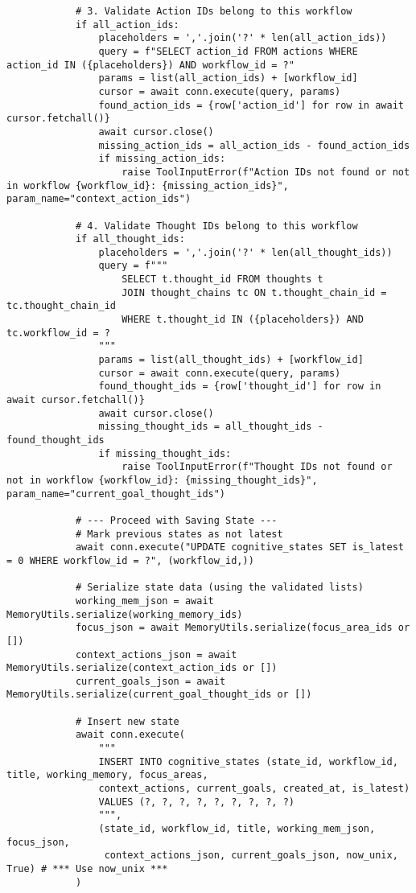 \documentclass[12pt,a4paper]{article}
\begin{document}
\begin{pageablecode}
\begin{verbatim}
            # 3. Validate Action IDs belong to this workflow
            if all_action_ids:
                placeholders = ','.join('?' * len(all_action_ids))
                query = f"SELECT action_id FROM actions WHERE action_id IN ({placeholders}) AND workflow_id = ?"
                params = list(all_action_ids) + [workflow_id]
                cursor = await conn.execute(query, params)
                found_action_ids = {row['action_id'] for row in await cursor.fetchall()}
                await cursor.close()
                missing_action_ids = all_action_ids - found_action_ids
                if missing_action_ids:
                    raise ToolInputError(f"Action IDs not found or not in workflow {workflow_id}: {missing_action_ids}", param_name="context_action_ids")

            # 4. Validate Thought IDs belong to this workflow
            if all_thought_ids:
                placeholders = ','.join('?' * len(all_thought_ids))
                query = f"""
                    SELECT t.thought_id FROM thoughts t
                    JOIN thought_chains tc ON t.thought_chain_id = tc.thought_chain_id
                    WHERE t.thought_id IN ({placeholders}) AND tc.workflow_id = ?
                """
                params = list(all_thought_ids) + [workflow_id]
                cursor = await conn.execute(query, params)
                found_thought_ids = {row['thought_id'] for row in await cursor.fetchall()}
                await cursor.close()
                missing_thought_ids = all_thought_ids - found_thought_ids
                if missing_thought_ids:
                    raise ToolInputError(f"Thought IDs not found or not in workflow {workflow_id}: {missing_thought_ids}", param_name="current_goal_thought_ids")

            # --- Proceed with Saving State ---
            # Mark previous states as not latest
            await conn.execute("UPDATE cognitive_states SET is_latest = 0 WHERE workflow_id = ?", (workflow_id,))

            # Serialize state data (using the validated lists)
            working_mem_json = await MemoryUtils.serialize(working_memory_ids)
            focus_json = await MemoryUtils.serialize(focus_area_ids or [])
            context_actions_json = await MemoryUtils.serialize(context_action_ids or [])
            current_goals_json = await MemoryUtils.serialize(current_goal_thought_ids or [])

            # Insert new state
            await conn.execute(
                """
                INSERT INTO cognitive_states (state_id, workflow_id, title, working_memory, focus_areas,
                context_actions, current_goals, created_at, is_latest)
                VALUES (?, ?, ?, ?, ?, ?, ?, ?, ?)
                """,
                (state_id, workflow_id, title, working_mem_json, focus_json,
                 context_actions_json, current_goals_json, now_unix, True) # *** Use now_unix ***
            )


\end{verbatim}
\end{pageablecode}
\end{document}
